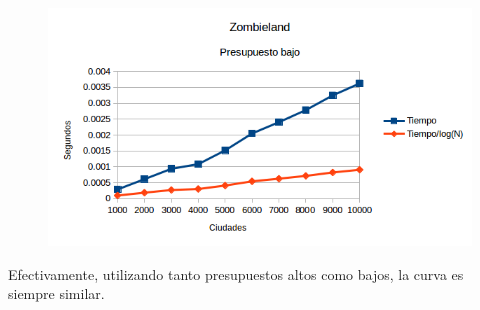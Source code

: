   \begin{figure}[h!]
   \begin{right}
 	\includegraphics{imagenes/ej1/Mediciones/Grafico4.png}
   \end{right}
 \end{figure}
 
 
Efectivamente, utilizando tanto presupuestos altos como bajos, la curva es siempre similar.

\newpage
 





